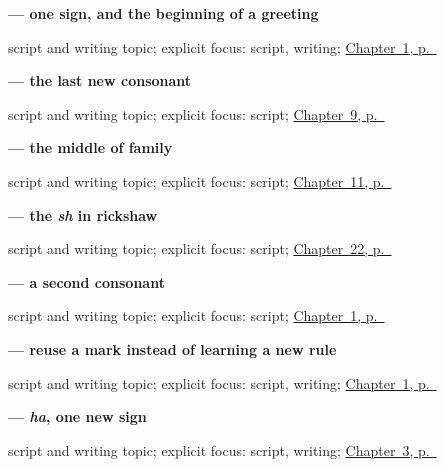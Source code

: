 \noindent\begin{minipage}[t]{\linewidth}
\raggedright
\textbf{ — one sign, and the beginning of a greeting}\par
\footnotesize script and writing topic; explicit focus: script, writing; \hyperref[ch:mw-ram-ram-sa]{Chapter~1, p.~\pageref*{ch:mw-ram-ram-sa}}
\end{minipage}\par\smallskip

\noindent\begin{minipage}[t]{\linewidth}
\raggedright
\textbf{ — the last new consonant}\par
\footnotesize script and writing topic; explicit focus: script; \hyperref[ch:mw-see-you-later]{Chapter~9, p.~\pageref*{ch:mw-see-you-later}}
\end{minipage}\par\smallskip

\noindent\begin{minipage}[t]{\linewidth}
\raggedright
\textbf{ — the middle of family}\par
\footnotesize script and writing topic; explicit focus: script; \hyperref[ch:mw-family-seven]{Chapter~11, p.~\pageref*{ch:mw-family-seven}}
\end{minipage}\par\smallskip

\noindent\begin{minipage}[t]{\linewidth}
\raggedright
\textbf{ — the \emph{sh} in rickshaw}\par
\footnotesize script and writing topic; explicit focus: script; \hyperref[ch:mw-transport-five]{Chapter~22, p.~\pageref*{ch:mw-transport-five}}
\end{minipage}\par\smallskip

\noindent\begin{minipage}[t]{\linewidth}
\raggedright
\textbf{ — a second consonant}\par
\footnotesize script and writing topic; explicit focus: script; \hyperref[ch:mw-ram-ram-sa]{Chapter~1, p.~\pageref*{ch:mw-ram-ram-sa}}
\end{minipage}\par\smallskip

\noindent\begin{minipage}[t]{\linewidth}
\raggedright
\textbf{ — reuse a mark instead of learning a new rule}\par
\footnotesize script and writing topic; explicit focus: script, writing; \hyperref[ch:mw-ram-ram-sa]{Chapter~1, p.~\pageref*{ch:mw-ram-ram-sa}}
\end{minipage}\par\smallskip

\noindent\begin{minipage}[t]{\linewidth}
\raggedright
\textbf{ — \emph{ha}, one new sign}\par
\footnotesize script and writing topic; explicit focus: script, writing; \hyperref[ch:mw-haan-saa]{Chapter~3, p.~\pageref*{ch:mw-haan-saa}}
\end{minipage}\par\smallskip
